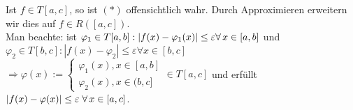 \documentclass[../ana2.tex]{subfiles}
\begin{document}
\begin{bew}
    Ist \( f \in T[a,c] \), so ist \( (*) \) offensichtlich wahr.
    Durch Approximieren erweitern wir dies auf 
    \( f \in R([a,c]) \).\\
    Man beachte: ist \( \varphi_1 \in T[a,b]: \abs{f(x) - \varphi_1(x)} 
    \leq \varepsilon \forall x\in[a,b] \)
    und \( \varphi_2 \in T[b, c]: |f(x)-\varphi_2| \leq \varepsilon \forall x \in [b,c]\)    
    \( \Rightarrow \varphi(x) := \begin{cases}
        \varphi_1(x), x\in [a,b]\\
        \varphi_2(x), x \in (b,c]
    \end{cases} \in T[a,c] \) und erfüllt \( \abs{f(x) - \varphi(x)} \leq \varepsilon 
    \; \forall x \in [a,c] \).
\end{bew}
\end{document}
